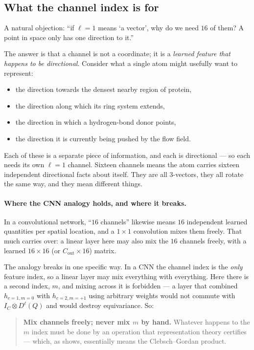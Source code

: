 \documentclass[11pt,a4paper]{report}
\theoremstyle{definition}
\theoremstyle{remark}
\begin{document}
\subsection{What the channel index is for}

A natural objection: ``if $\ell=1$ means `a vector', why do we need $16$ of
them? A point in space only has one direction to it.''

The answer is that a channel is not a coordinate; it is a \emph{learned
feature that happens to be directional}. Consider what a single atom might
usefully want to represent:

\begin{itemize}[nosep]
\item the direction towards the densest nearby region of protein,
\item the direction along which its ring system extends,
\item the direction in which a hydrogen-bond donor points,
\item the direction it is currently being pushed by the flow field.
\end{itemize}

Each of these is a separate piece of information, and each is directional
--- so each needs its own $\ell=1$ channel. Sixteen channels means the atom
carries sixteen independent directional facts about itself. They are all
$3$-vectors, they all rotate the same way, and they mean different things.

\paragraph{Where the CNN analogy holds, and where it breaks.} In a
convolutional network, ``$16$ channels'' likewise means $16$ independent
learned quantities per spatial location, and a $1\times1$ convolution mixes
them freely. That much carries over: a linear layer here may also mix the
$16$ channels freely, with a learned $16\times16$ (or $C_{\text{out}}\times16$)
matrix.

The analogy breaks in one specific way. In a CNN the channel index is the
\emph{only} feature index, so a linear layer may mix everything with
everything. Here there is a second index, $m$, and mixing across it is
forbidden --- a layer that combined $h_{c=1,m=0}$ with $h_{c=2,m=+1}$ using
arbitrary weights would not commute with $I_C\otimes D^\ell(Q)$ and would
destroy equivariance. So:

\begin{quote}
\textbf{Mix channels freely; never mix $m$ by hand.} Whatever happens to the
$m$ index must be done by an operation that representation theory certifies
--- which, as  shows, essentially means the
Clebsch--Gordan product.
\end{quote}
\end{document}
